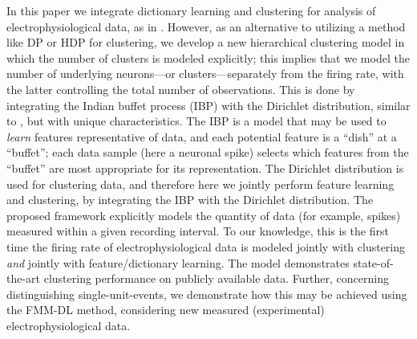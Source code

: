 \documentclass[journal]{IEEEtran}
\begin{document}
% 
In this paper we integrate dictionary learning and clustering for analysis of electrophysiological data, as in \cite{Dilan,Bo2011}. However, as an alternative to utilizing a method like DP or HDP \cite{Wood2009,Bo2011} for clustering, we develop a new hierarchical clustering model in which the number of clusters is modeled explicitly; this implies that we model the number of underlying {neurons}---or clusters---separately from the firing rate, with the latter controlling the total number of observations. This is done by integrating the Indian buffet process (IBP) \cite{IBP} with the Dirichlet distribution, similar to \cite{compound}, but with unique characteristics. The IBP is a model that may be used to \emph{learn} features representative of data, and each potential feature is a ``dish'' at a ``buffet''; each data sample (here {a} neuronal spike) selects which features from the ``buffet'' are most appropriate for its representation. The Dirichlet distribution is used for clustering data, and therefore here we jointly perform feature learning and clustering, by integrating the IBP with the Dirichlet distribution. The proposed framework explicitly models the quantity of data (for example, spikes) measured within a given recording interval. {To our knowledge,} this is the first time the firing rate of electrophysiological data is modeled jointly with clustering \emph{and} jointly with feature/dictionary learning. The model demonstrates state-of-the-art clustering performance on publicly available data. Further, concerning distinguishing single-unit-events, we demonstrate how this may be achieved using the {FMM-DL}  method, considering new measured (experimental) electrophysiological data.
\end{document}
